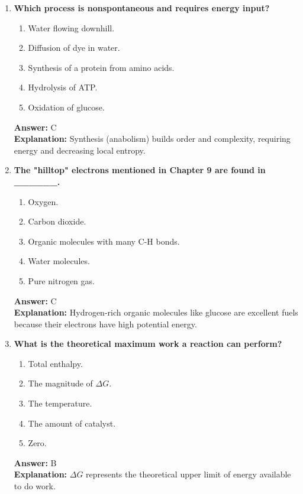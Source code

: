 \documentclass[11pt, a4paper]{article}
\begin{document}
\begin{enumerate}[leftmargin=*, label=\arabic*.]
\item \textbf{Which process is nonspontaneous and requires energy input?}
\begin{enumerate}[label=\Alph*.]
    \item Water flowing downhill.
    \item Diffusion of dye in water.
    \item Synthesis of a protein from amino acids.
    \item Hydrolysis of ATP.
    \item Oxidation of glucose.
\end{enumerate}
\textbf{Answer:} C \\
\textbf{Explanation:} Synthesis (anabolism) builds order and complexity, requiring energy and decreasing local entropy.

\item \textbf{The "hilltop" electrons mentioned in Chapter 9 are found in \_\_\_\_\_\_.}
\begin{enumerate}[label=\Alph*.]
    \item Oxygen.
    \item Carbon dioxide.
    \item Organic molecules with many C-H bonds.
    \item Water molecules.
    \item Pure nitrogen gas.
\end{enumerate}
\textbf{Answer:} C \\
\textbf{Explanation:} Hydrogen-rich organic molecules like glucose are excellent fuels because their electrons have high potential energy.

\item \textbf{What is the theoretical maximum work a reaction can perform?}
\begin{enumerate}[label=\Alph*.]
    \item Total enthalpy.
    \item The magnitude of $\Delta G$.
    \item The temperature.
    \item The amount of catalyst.
    \item Zero.
\end{enumerate}
\textbf{Answer:} B \\
\textbf{Explanation:} $\Delta G$ represents the theoretical upper limit of energy available to do work.


\end{enumerate}
\end{document}
